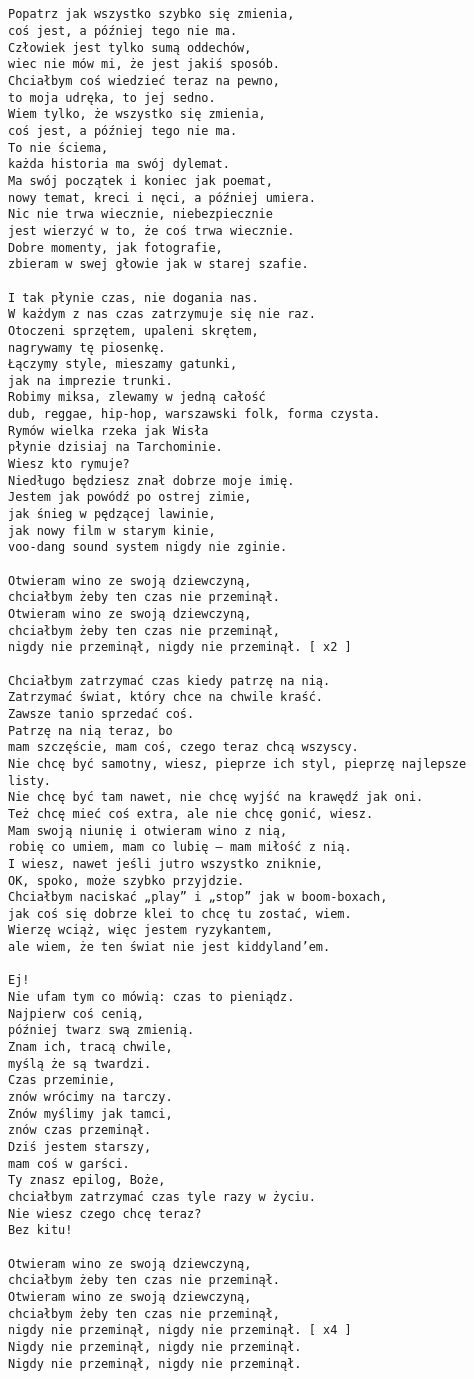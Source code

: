 \documentclass[12pt]{article}
\begin{document}
\subsection*{}
\begin{verbatim}
Popatrz jak wszystko szybko się zmienia,
coś jest, a później tego nie ma.
Człowiek jest tylko sumą oddechów,
wiec nie mów mi, że jest jakiś sposób.
Chciałbym coś wiedzieć teraz na pewno,
to moja udręka, to jej sedno.
Wiem tylko, że wszystko się zmienia,
coś jest, a później tego nie ma.
To nie ściema,
każda historia ma swój dylemat.
Ma swój początek i koniec jak poemat,
nowy temat, kreci i nęci, a później umiera.
Nic nie trwa wiecznie, niebezpiecznie
jest wierzyć w to, że coś trwa wiecznie.
Dobre momenty, jak fotografie,
zbieram w swej głowie jak w starej szafie.

I tak płynie czas, nie dogania nas.
W każdym z nas czas zatrzymuje się nie raz.
Otoczeni sprzętem, upaleni skrętem,
nagrywamy tę piosenkę.
Łączymy style, mieszamy gatunki,
jak na imprezie trunki.
Robimy miksa, zlewamy w jedną całość
dub, reggae, hip-hop, warszawski folk, forma czysta.
Rymów wielka rzeka jak Wisła
płynie dzisiaj na Tarchominie.
Wiesz kto rymuje?
Niedługo będziesz znał dobrze moje imię.
Jestem jak powódź po ostrej zimie,
jak śnieg w pędzącej lawinie,
jak nowy film w starym kinie,
voo-dang sound system nigdy nie zginie.

Otwieram wino ze swoją dziewczyną,
chciałbym żeby ten czas nie przeminął.
Otwieram wino ze swoją dziewczyną,
chciałbym żeby ten czas nie przeminął,
nigdy nie przeminął, nigdy nie przeminął. [ x2 ]

Chciałbym zatrzymać czas kiedy patrzę na nią.
Zatrzymać świat, który chce na chwile kraść.
Zawsze tanio sprzedać coś.
Patrzę na nią teraz, bo
mam szczęście, mam coś, czego teraz chcą wszyscy.
Nie chcę być samotny, wiesz, pieprze ich styl, pieprzę najlepsze listy.
Nie chcę być tam nawet, nie chcę wyjść na krawędź jak oni.
Też chcę mieć coś extra, ale nie chcę gonić, wiesz.
Mam swoją niunię i otwieram wino z nią,
robię co umiem, mam co lubię – mam miłość z nią.
I wiesz, nawet jeśli jutro wszystko zniknie,
OK, spoko, może szybko przyjdzie.
Chciałbym naciskać „play” i „stop” jak w boom-boxach,
jak coś się dobrze klei to chcę tu zostać, wiem.
Wierzę wciąż, więc jestem ryzykantem,
ale wiem, że ten świat nie jest kiddyland’em.

Ej!
Nie ufam tym co mówią: czas to pieniądz.
Najpierw coś cenią,
później twarz swą zmienią.
Znam ich, tracą chwile,
myślą że są twardzi.
Czas przeminie,
znów wrócimy na tarczy.
Znów myślimy jak tamci,
znów czas przeminął.
Dziś jestem starszy,
mam coś w garści.
Ty znasz epilog, Boże,
chciałbym zatrzymać czas tyle razy w życiu.
Nie wiesz czego chcę teraz?
Bez kitu!

Otwieram wino ze swoją dziewczyną,
chciałbym żeby ten czas nie przeminął.
Otwieram wino ze swoją dziewczyną,
chciałbym żeby ten czas nie przeminął,
nigdy nie przeminął, nigdy nie przeminął. [ x4 ]
Nigdy nie przeminął, nigdy nie przeminął.
Nigdy nie przeminął, nigdy nie przeminął.
\end{verbatim}
\clearpage
\end{document}
